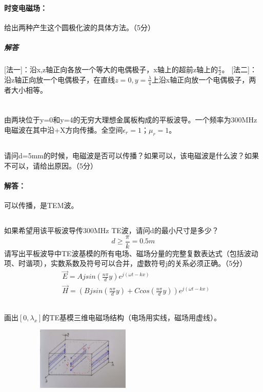 \documentclass[UTF8]{ctexart}
\begin{document}
\paragraph{时变电磁场：}
给出两种产生这个圆极化波的具体方法。（5分）
\subparagraph{解答}
[法一]：沿x,z轴正向各放一个等大的电偶极子，x轴上的超前z轴上的$\frac{\pi}{2}$。
[法二]：沿z轴正向放一个电偶极子，在直线${z=0,y=\frac{\lambda}{4}}$上沿x轴正向放一个电偶极子，两者大小相等。
\section{}
由两块位于y=0和y=4的无穷大理想金属板构成的平板波导。一个频率为300MHz电磁波在其中沿+X方向传播。全空间$\epsilon_r=1$；$\mu_r=1$。
\subsection{}
请问d=5mm的时候，电磁波是否可以传播？如果可以，该电磁波是什么波？如果不可以，请给出原因。（5分）
\paragraph{解答：}
可以传播，是TEM波。
\subsection{}
如果希望用该平板波导传300MHz TE波，请问d的最小尺寸是多少？
\begin{equation*}
d \geq \frac{\pi}{k}=0.5m
\end{equation*}
请写出平板波导中TE波基模的所有电场、磁场分量的完整复数表达式（包括波动项、时谐项），实数系数及符号可以合并，虚数符号j的关系必须正确。（5分）
\begin{equation*}
\begin{aligned}
&\vec E=Ajsin(\frac{n\pi}{d}y)e^{j(\omega t-kx)}\\
&\vec H=(Bjsin(\frac{n\pi}{d}y)+Ccos(\frac{n\pi}{d}y))e^{j(\omega t-kx)}
\end{aligned}
\end{equation*}
\subsection{}
画出$[0,\lambda_x]$的TE基模三维电磁场结构（电场用实线，磁场用虚线）。
\begin{figure}[H]
\centering
\includegraphics[width=6cm,height=3cm]{2016-3.jpg}
\end{figure}
\end{document}
